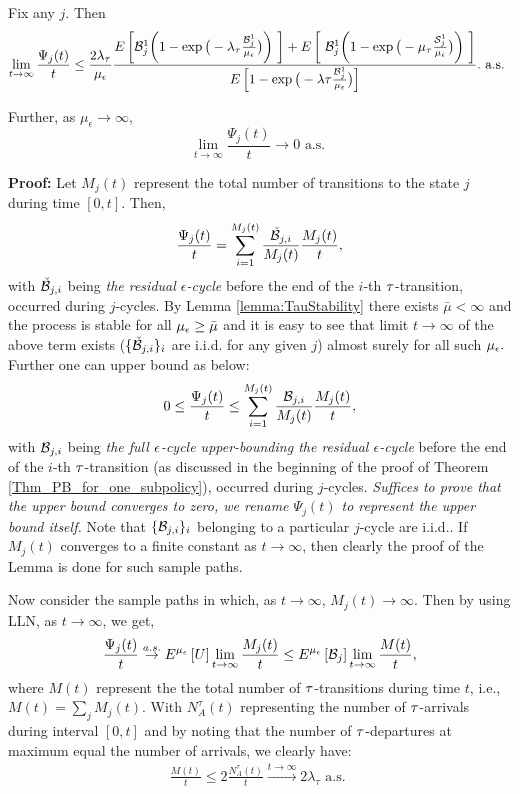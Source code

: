 \begin{lemma}
	\label{Lemma_Psij}
	Fix any $j$. Then 
	$$
	\lim_{t \to \infty}   \frac{\Psi_j(t) }{t}   \le  \frac{ 2 \lambda_\tau  }{{\mu_\epsilon}}   
	\frac{E \left[ \mathcal B_j^1  \bigg(1 - \exp \big(-\lambda_\tau \frac{\mathcal B_j^1}{\mu_\epsilon} \big)\bigg) \ \right] + E \left[ \ \mathcal B_j^1  \bigg(1 - \exp \big( -\mu_\tau \frac{\mathcal{S}_j^1}{\mu_\epsilon} \big)\bigg) \ \right]}{E\left[ 1 - \exp \big(-\lambda\tau \frac{\mathcal B_j^1}{\mu_\epsilon} \big)\right]} .
	\mbox {  a.s.  }
	$$

	Further, as  $\mu_\epsilon \to \infty,$
	$$
	\lim_{t \to \infty}   \frac{\Psi_j(t) }{t}  \to 0 \mbox {  a.s.  }
	$$
\end{lemma}
{\bf Proof:} Let $M_j(t)$ represent the total number of transitions to the state $j$ during time $[0, t]$. Then,
$$
\frac{\Psi_j(t)}{t} =  \sum_{i=1}^ {M_j(t)}   \frac{  {\check {\mathcal{B}}}_{j,i} } {M_j(t)} \frac{M_j(t)}{t} ,
$$
 with ${\check {\mathcal{B}}}_{j,i}$ being  {\it the   residual $\epsilon$-cycle} before the end of the  $i$-th ${\tau}$-transition,  occurred during $j$-cycles. By Lemma \ref{lemma:TauStability} there exists ${\bar \mu} < \infty$ and the process is stable for all $\mu_{ \epsilon } \ge {\bar \mu} $ and it is easy to see that limit $t \to \infty$ of the above term exists  ($\{{\check {\mathcal{B}}}_{j,i}\}_i$ are i.i.d. for any given $j$)  almost surely for all such $\mu_{ \epsilon }.$
Further one can upper bound as below:
\begin{eqnarray}
\label{Eqn_Psi_Up}
	0 \le \frac{\Psi_j(t)}{t} \le \sum_{i=1}^ {M_j(t)}   \frac{  \mathcal{B}_{j,i} } {M_j(t)} \frac{M_j(t)}{t} ,
\end{eqnarray} with $\mathcal{B}_{j,i}$ being  {\it the full ${ \epsilon }$-cycle upper-bounding the residual $\epsilon$-cycle} before the end of the  $i$-th ${\tau}$-transition (as discussed in the beginning of the
proof of Theorem \ref{Thm_PB_for_one_subpolicy}),  occurred during $j$-cycles.  {\it Suffices to prove that the upper bound converges to zero, we rename $\Psi_j(t)$ to represent the upper bound itself.}
Note that $\{\mathcal{B}_{j,i} \}_i$ belonging to a particular $j$-cycle are i.i.d..
If $M_j(t)$ converges to  a finite constant as $t \to \infty$,  then clearly the proof of the  Lemma is done  for such sample paths. 

Now consider the sample paths in which, as $t \to \infty$,
$M_j(t) \to \infty$.  Then by 
using LLN, as $t \to \infty$, we get,
\begin{eqnarray}
\label{Eqn_Psi_Split}
\frac{\Psi_j(t)}{t}  \stackrel{a.s.}{\to} E^{\mu_\epsilon}  \left [ U \right]  \lim_{t \to \infty} \frac{M_j(t)}{t} \le E^{\mu_\epsilon}  \left [ \mathcal{B}_j \right]  \lim_{t \to \infty} \frac{M(t)}{t},
\end{eqnarray}
where  $M(t)$ represent the the total number of ${\tau}$-transitions during time $t$, i.e., $M(t) = \sum_j M_j(t)$. 
With $N_{A}^\tau (t)$  representing the number of ${\tau}$-arrivals during interval $[0, t]$ and by noting that the number of ${\tau}$-departures at maximum equal the number of arrivals, we clearly have:
\begin{eqnarray}
\label{Eqn_M(t)}
\frac{M (t)}{t}  \le 2 \frac{N_{A}^\tau (t)}{t}  \stackrel{t \to \infty }{ \longrightarrow} 2 \lambda_\tau \mbox{ a.s. } 
\end{eqnarray}


